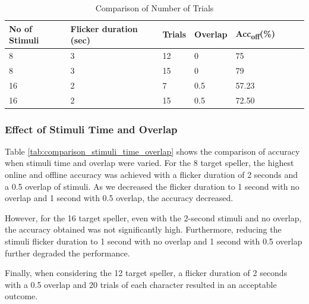 \begin{table}[h]
\small
\caption{Comparison of Number of Trials}
\label{tab:comparaision_no_of_samples}
\begin{tabular}{@{}p{1.2cm} p{2.5cm} p{1.5cm} p{2cm} p{1.7cm} p{1.5cm} p{2cm} p{2cm}@{}}
\toprule
No of Stimuli  & Flicker   duration (sec) & Trials & Overlap & Acc\textsubscript{off}(\%)  \\ \midrule
8                    & 3                        & 12                             & 0                       & 75                      \\
8                   & 3                        & 15                          & 0                       & 79                       \\
16                 & 2                        & 7                          & 0.5                     & 57.23                        \\
16                 & 2                        & 15                        & 0.5                     & 72.50                       \\\bottomrule
\end{tabular}
\end{table}

\subsubsection{Effect of Stimuli Time and Overlap}

Table \ref{tab:comparison_stimuli_time_overlap} shows the comparison of accuracy when stimuli time and overlap were varied. For the 8 target speller, the highest online and offline accuracy was achieved with a flicker duration of 2 seconds and a 0.5 overlap of stimuli. As we decreased the flicker duration to 1 second with no overlap and 1 second with 0.5 overlap, the accuracy decreased.

However, for the 16 target speller, even with the 2-second stimuli and no overlap, the accuracy obtained was not significantly high. Furthermore, reducing the stimuli flicker duration to 1 second with no overlap and 1 second with 0.5 overlap further degraded the performance.

Finally, when considering the 12 target speller, a flicker duration of 2 seconds with a 0.5 overlap and 20 trials of each character resulted in an acceptable outcome.

